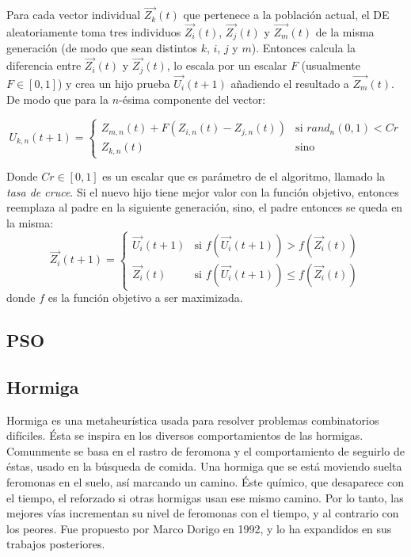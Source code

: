 Para cada vector individual $\overrightarrow{Z_k}(t)$ que pertenece
a la poblaci\'on actual, el DE aleatoriamente toma tres individuos
$\overrightarrow{Z_i}(t)$, $\overrightarrow{Z_j}(t)$ y $\overrightarrow{Z_m}(t)$ de la misma generaci\'on (de modo que sean distintos $k$, 
$i$, $j$ y $m$). Entonces calcula la diferencia entre $\overrightarrow{Z_i}(t)$ y $\overrightarrow{Z_j}(t)$, lo escala por un escalar $F$
(usualmente $F \in [0, 1]$) y crea un hijo prueba $\overrightarrow{U_i}(t + 1)$ a\~nadiendo el resultado a $\overrightarrow{Z_m}(t)$. De modo
que para la $n$-\'esima componente del vector:

\[
  U_{k,n}(t+1) =
  \begin{cases}
    Z_{m,n}(t) + F(Z_{i,n}(t) - Z_{j,n}(t))  & \text{si } rand_n(0,1) < Cr\\
    Z_{k,n}(t)                               & \text{sino}
  \end{cases}
\]

Donde $Cr \in [0, 1]$ es un escalar que es par\'ametro de el algoritmo,
llamado la \emph{tasa de cruce}. Si el nuevo hijo tiene mejor valor
con la funci\'on objetivo, entonces reemplaza al padre en la siguiente
generaci\'on, sino, el padre entonces se queda en la misma:
\[
  \overrightarrow{Z_i}(t+1) =
  \begin{cases}
    \overrightarrow{U_i}(t+1) & \text{si } f(\overrightarrow{U_i}(t+1)) > f(\overrightarrow{Z_i}(t)) \\
    \overrightarrow{Z_i}(t)   & \text{si } f(\overrightarrow{U_i}(t+1)) \leq f(\overrightarrow{Z_i}(t))
  \end{cases}
\]
donde $f$ es la funci\'on objetivo a ser maximizada.

\subsection{PSO} \label{sect:metapso}

\subsection{Hormiga} \label{sect:metaant}

Hormiga es una metaheurística usada para resolver problemas combinatorios
difíciles. \'Esta se inspira en los diversos comportamientos de las hormigas.
Comunmente se basa en el rastro de feromona y el comportamiento de seguirlo 
de éstas, usado en la búsqueda de comida. Una hormiga que se est\'a moviendo 
suelta feromonas en el suelo, as\'i marcando un camino. \'Este químico, que 
desaparece con el tiempo, el reforzado si otras hormigas usan ese mismo camino.
Por lo tanto, las mejores v\'ias incrementan su nivel de feromonas con el tiempo, 
y al contrario con los peores. Fue propuesto por Marco Dorigo en 1992, 
y lo ha expandidos en sus trabajos posteriores.
\cite{GePo2010} \cite{Le2007}

